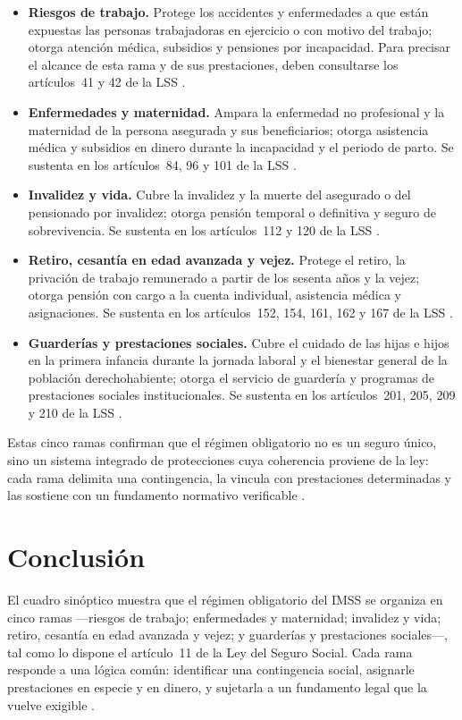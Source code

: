 \documentclass[12pt,letterpaper,oneside]{article}
\begin{document}
\begin{itemize}
  \item \textbf{Riesgos de trabajo.} Protege los accidentes y enfermedades a que est\'an expuestas las personas trabajadoras en ejercicio o con motivo del trabajo; otorga atenci\'on m\'edica, subsidios y pensiones por incapacidad. Para precisar el alcance de esta rama y de sus prestaciones, deben consultarse los art\'iculos~41 y 42 de la LSS \citep{lss2026}.
  \item \textbf{Enfermedades y maternidad.} Ampara la enfermedad no profesional y la maternidad de la persona asegurada y sus beneficiarios; otorga asistencia m\'edica y subsidios en dinero durante la incapacidad y el periodo de parto. Se sustenta en los art\'iculos~84, 96 y 101 de la LSS \citep{lss2026}.
  \item \textbf{Invalidez y vida.} Cubre la invalidez y la muerte del asegurado o del pensionado por invalidez; otorga pensi\'on temporal o definitiva y seguro de sobrevivencia. Se sustenta en los art\'iculos~112 y 120 de la LSS \citep{lss2026}.
  \item \textbf{Retiro, cesant\'ia en edad avanzada y vejez.} Protege el retiro, la privaci\'on de trabajo remunerado a partir de los sesenta a\~nos y la vejez; otorga pensi\'on con cargo a la cuenta individual, asistencia m\'edica y asignaciones. Se sustenta en los art\'iculos~152, 154, 161, 162 y 167 de la LSS \citep{lss2026}.
  \item \textbf{Guarder\'ias y prestaciones sociales.} Cubre el cuidado de las hijas e hijos en la primera infancia durante la jornada laboral y el bienestar general de la poblaci\'on derechohabiente; otorga el servicio de guarder\'ia y programas de prestaciones sociales institucionales. Se sustenta en los art\'iculos~201, 205, 209 y 210 de la LSS \citep{lss2026}.
\end{itemize}

Estas cinco ramas confirman que el r\'egimen obligatorio no es un seguro \'unico, sino un sistema integrado de protecciones cuya coherencia proviene de la ley: cada rama delimita una contingencia, la vincula con prestaciones determinadas y las sostiene con un fundamento normativo verificable \citep{bricenoRuiz2011,herreraMontes2024,stpsGuiaPrevisional}.

\clearpage
\section{Conclusi\'on}

El cuadro sin\'optico muestra que el r\'egimen obligatorio del IMSS se organiza en cinco ramas ---riesgos de trabajo; enfermedades y maternidad; invalidez y vida; retiro, cesant\'ia en edad avanzada y vejez; y guarder\'ias y prestaciones sociales---, tal como lo dispone el art\'iculo~11 de la Ley del Seguro Social. Cada rama responde a una l\'ogica com\'un: identificar una contingencia social, asignarle prestaciones en especie y en dinero, y sujetarla a un fundamento legal que la vuelve exigible \citep{lss2026}.
\end{document}

